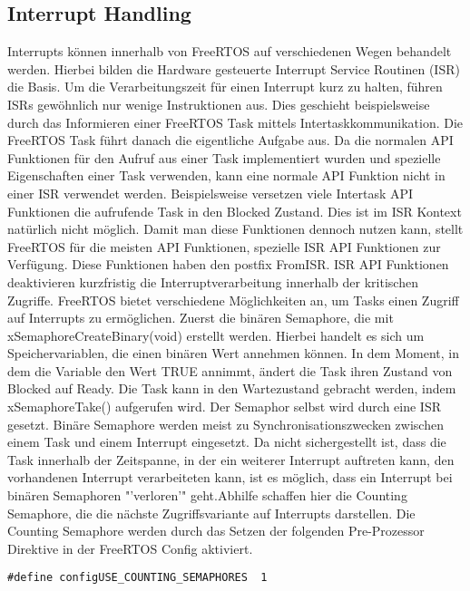 \subsection{Interrupt Handling}
\label{sec:Interrupt}
Interrupts können innerhalb von FreeRTOS auf verschiedenen Wegen behandelt werden. Hierbei bilden die Hardware gesteuerte Interrupt Service Routinen (ISR) die Basis. Um die Verarbeitungszeit für einen Interrupt kurz zu halten, führen ISRs gewöhnlich nur wenige Instruktionen aus. Dies geschieht beispielsweise durch das Informieren einer FreeRTOS Task mittels Intertaskkommunikation. Die FreeRTOS Task führt danach die eigentliche Aufgabe aus. Da die normalen API Funktionen für den Aufruf aus einer Task implementiert wurden und spezielle Eigenschaften einer Task verwenden, kann eine normale API Funktion nicht in einer ISR verwendet werden. Beispielsweise versetzen viele Intertask API Funktionen die aufrufende Task in den Blocked Zustand. Dies ist im ISR Kontext natürlich nicht möglich. Damit man diese Funktionen dennoch nutzen kann, stellt FreeRTOS für die meisten API Funktionen, spezielle ISR API Funktionen zur Verfügung. Diese Funktionen haben den postfix FromISR. ISR API Funktionen deaktivieren kurzfristig die Interruptverarbeitung innerhalb der kritischen Zugriffe.
FreeRTOS bietet verschiedene Mög\-lich\-keit\-en an, um Tasks einen Zugriff auf Interrupts zu ermöglichen.\newline
Zuerst die binären Semaphore, die mit xSemaphoreCreateBinary(void) erstellt werden. Hierbei handelt es sich um Speichervariablen, die einen binären Wert annehmen können. In dem Moment, in dem die Variable den Wert TRUE annimmt, ändert die Task ihren Zustand von Blocked auf Ready. Die Task kann in den Wartezustand gebracht werden, indem xSemaphoreTake() aufgerufen wird. Der Semaphor selbst wird durch eine ISR gesetzt. Binäre Semaphore werden meist zu Synchronisationszwecken zwischen einem Task und einem Interrupt eingesetzt.
Da nicht sichergestellt ist, dass die Task innerhalb der Zeitspanne, in der ein weiterer Interrupt auftreten kann, den vorhandenen Interrupt verarbeiteten kann, ist es möglich, dass ein Interrupt bei binären Semaphoren "'verloren'" geht.\newline Abhilfe schaffen hier die Counting Semaphore, die die nächste Zugriffsvariante auf Interrupts darstellen. Die Counting Semaphore werden durch das Setzen der folgenden Pre-Prozessor Direktive in der FreeRTOS Config aktiviert.
\begin{lstlisting}[numbers = none]
#define configUSE_COUNTING_SEMAPHORES  1
\end{lstlisting}
